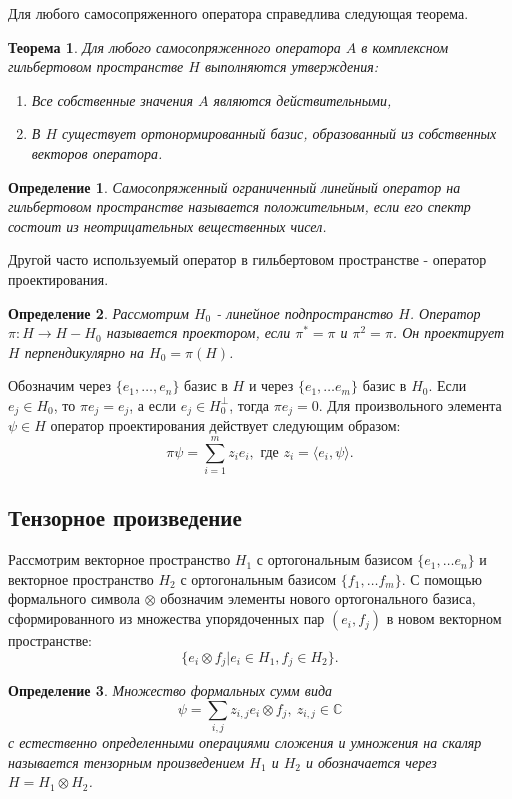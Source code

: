 \documentclass[%
master,         %
subf,           %
href,           %
,times         %
]{disser}
\numberwithin{equation}{section}
\numberwithin{figure}{section}
\newtheorem{theorem}{Теорема}[section]
\newtheorem{definition}{Определение}[section]
\begin{document}
Для любого самосопряженного оператора справедлива следующая теорема. 
\begin{theorem}
Для любого самосопряженного оператора $A$ в комплексном гильбертовом пространстве $H$ выполняются утверждения:
\begin{enumerate}
\item Все собственные значения $A$ являются действительными,
\item В $H$ существует ортонормированный базис, образованный из собственных векторов оператора.
\end{enumerate}
\end{theorem}

\begin{definition}
Самосопряженный ограниченный линейный оператор на гильбертовом пространстве называется положительным, если его спектр состоит из неотрицательных вещественных чисел.
\end{definition}

Другой часто используемый оператор в гильбертовом пространстве - оператор проектирования.
\begin{definition}
Рассмотрим $H_0$ - линейное подпространство $H$. Оператор $\pi: H \to H - H_0$ называется проектором, если $\pi^* = \pi$ и $\pi^2 = \pi$. Он проектирует $H$ перпендикулярно на $H_0 = \pi(H)$.
\end{definition}
Обозначим через $\{e_1, \ldots, e_n\}$ базис в $H$ и через $\{e_1, \ldots e_m\}$ базис в $H_0$. Если $e_j \in H_0$, то $\pi e_j = e_j$, а если $e_j\in H_0^\perp$, тогда $\pi e_j = 0$. Для произвольного элемента $\psi\in H$ оператор проектирования действует следующим образом: 
\[
\pi\psi = \sum_{i = 1}^m z_ie_i, \mbox{ где } z_i = \langle e_i, \psi\rangle.
\]

\subsection{Тензорное произведение}
Рассмотрим векторное пространство $H_1$ с ортогональным базисом $\{e_1, \ldots e_n\}$ и векторное пространство $H_2$ с ортогональным базисом $\{f_1,\ldots f_m\}$. С помощью формального символа $\otimes$ обозначим элементы нового ортогонального базиса, сформированного из множества упорядоченных пар $(e_i, f_j)$ в новом векторном пространстве:
\begin{equation}
\{e_i \otimes f_j | e_i \in H_1, f_j \in H_2\}. \label{eq:tensor_basis}
\end{equation}

\begin{definition}
Множество формальных сумм вида
\begin{equation}
\psi = \sum_{i,j}z_{i,j}e_i\otimes f_j,\ z_{i,j} \in \mathbb{C}
\label{eq:tensor_element}
\end{equation}
с естественно определенными операциями сложения и умножения на скаляр называется тензорным произведением $H_1$ и $H_2$ и обозначается через $H = H_1\otimes H_2$.
\end{definition}
\end{document}
